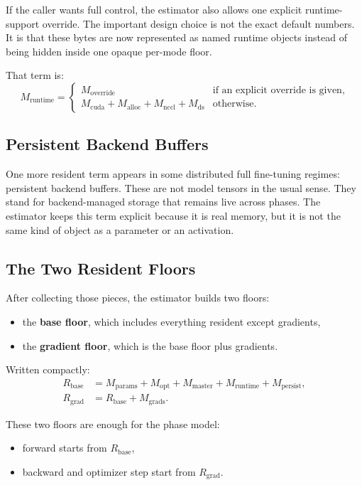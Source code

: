 If the caller wants full control, the estimator also allows one explicit
runtime-support override. The important design choice is not the exact default
numbers. It is that these bytes are now represented as named runtime objects
instead of being hidden inside one opaque per-mode floor.

That term is:
\[
M_{\mathrm{runtime}} =
\begin{cases}
M_{\mathrm{override}} & \text{if an explicit override is given}, \\
M_{\mathrm{cuda}} + M_{\mathrm{alloc}} + M_{\mathrm{nccl}} + M_{\mathrm{ds}}
& \text{otherwise.}
\end{cases}
\]

\subsection{Persistent Backend Buffers}
One more resident term appears in some distributed full fine-tuning regimes:
persistent backend buffers. These are not model tensors in the usual sense.
They stand for backend-managed storage that remains live across phases. The
estimator keeps this term explicit because it is real memory, but it is not the
same kind of object as a parameter or an activation.

\subsection{The Two Resident Floors}
After collecting those pieces, the estimator builds two floors:
\begin{itemize}[leftmargin=1.5em]
\item the \textbf{base floor}, which includes everything resident except
gradients,
\item the \textbf{gradient floor}, which is the base floor plus gradients.
\end{itemize}

Written compactly:
\begin{align*}
R_{\mathrm{base}} &= M_{\mathrm{params}} + M_{\mathrm{opt}}
+ M_{\mathrm{master}} + M_{\mathrm{runtime}} + M_{\mathrm{persist}}, \\
R_{\mathrm{grad}} &= R_{\mathrm{base}} + M_{\mathrm{grads}}.
\end{align*}

These two floors are enough for the phase model:
\begin{itemize}[leftmargin=1.5em]
\item forward starts from $R_{\mathrm{base}}$,
\item backward and optimizer step start from $R_{\mathrm{grad}}$.
\end{itemize}

